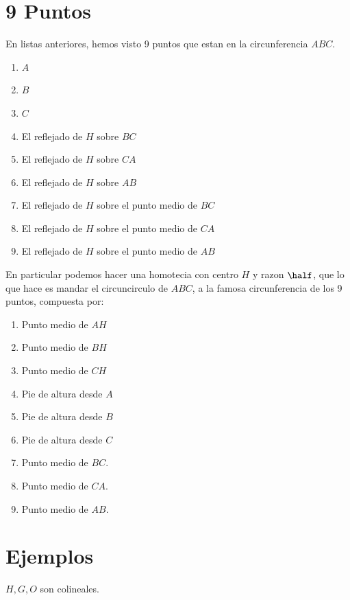 \documentclass[11pt]{scrartcl}
\begin{document}
\section{9 Puntos}

En listas anteriores, hemos visto 9 puntos que estan en la circunferencia $ABC$. \\

\begin{enumerate}
    \item $A$
    \item $B$
    \item $C$
    \item El reflejado de $H$ sobre $BC$
    \item El reflejado de $H$ sobre $CA$
    \item El reflejado de $H$ sobre $AB$
    \item El reflejado de $H$ sobre el punto medio de $BC$
    \item El reflejado de $H$ sobre el punto medio de $CA$
    \item El reflejado de $H$ sobre el punto medio de $AB$
\end{enumerate}


En particular podemos hacer una homotecia con centro $H$ y razon $\half$, que lo que hace es mandar el 
circuncirculo de $ABC$, a la famosa circunferencia de los 9 puntos, compuesta por:
\begin{enumerate}
    \item Punto medio de $AH$
    \item Punto medio de $BH$
    \item Punto medio de $CH$
    \item Pie de altura desde $A$
    \item Pie de altura desde $B$
    \item Pie de altura desde $C$
    \item Punto medio de $BC$.
    \item Punto medio de $CA$.
    \item Punto medio de $AB$.
\end{enumerate}
\section{Ejemplos}

\begin{problem}
$H,G,O$ son colineales.
\end{problem}
\end{document}
